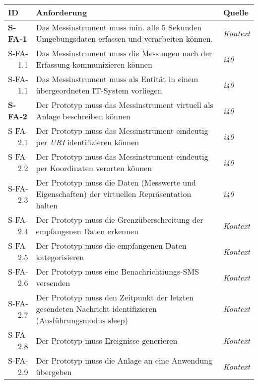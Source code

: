   \begin{tabularx}{\textwidth}{@{}lXp{2cm}@{}}
      \toprule
      ID                & Anforderung & Quelle \\
      \midrule
      \endhead
      \textbf{S-FA-1} \label{sfa1}             &  Das Messinstrument muss min. alle 5 Sekunden Umgebungsdaten erfassen und verarbeiten können.   &  \textit{Kontext}     \\
      \multicolumn{1}{r}{S-FA-1.1} &   Das Messinstrument muss die Messungen nach der Erfassung kommunizieren können & \textit{\ac{i40}}\\
      \multicolumn{1}{r}{S-FA-1.1} &   Das Messinstrument muss als Entität in einem übergeordneten IT-System vorliegen & \textit{\ac{i40}}\\
      \textbf{S-FA-2}              &   Der Prototyp muss das Messinstrument virtuell als Anlage beschreiben können & \textit{\ac{i40}}        \\
      \multicolumn{1}{r}{S-FA-2.1} &   Der Prototyp muss das Messinstrument eindeutig per \textit{URI} identifizieren können  & \textit{\ac{i40}}\\
      \multicolumn{1}{r}{S-FA-2.2} &   Der Prototyp muss das Messinstrument eindeutig per Koordinaten verorten können  & \textit{\ac{i40}}\\
      \multicolumn{1}{r}{S-FA-2.3} & Der Prototyp muss die Daten (Messwerte und Eigenschaften) der virtuellen Repräsentation halten  & \textit{\ac{i40}} \\
      \multicolumn{1}{r}{S-FA-2.4} & Der Prototyp muss die Grenzüberschreitung der empfangenen Daten erkennen &  \textit{Kontext}\\
      \multicolumn{1}{r}{S-FA-2.5} & Der Prototyp muss die empfangenen Daten kategorisieren &  \textit{Kontext}\\
      \multicolumn{1}{r}{S-FA-2.6} & Der Prototyp muss eine Benachrichtiungs-SMS versenden  &  \textit{Kontext}\\
      \multicolumn{1}{r}{S-FA-2.7} & Der Prototyp muss den Zeitpunkt der letzten gesendeten Nachricht identifizieren (Ausführungsmodus sleep)&  \textit{Kontext} \\
      \multicolumn{1}{r}{S-FA-2.8} & Der Prototyp muss Ereignisse generieren  &  \textit{Kontext}\\
      \multicolumn{1}{r}{S-FA-2.9} & Der Prototyp muss die Anlage an eine Anwendung übergeben &  \textit{Kontext} \\

\end{tabularx}
